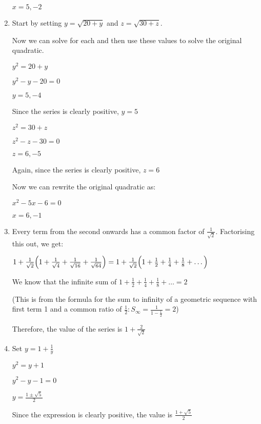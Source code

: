 \documentclass[../main.tex]{subfiles}
\begin{document}
\begin{enumerate}[itemsep=1cm]
    $x=5, -2$


    \item 
    Start by setting $y=\sqrt{20+y}$ and $z=\sqrt{30+z}$.

    Now we can solve for each and then use these values to solve the original quadratic.

    $y^2=20+y$

    $y^2-y-20=0$

    $y=5, -4$

    Since the series is clearly positive, $y=5$

    $z^2=30+z$

    $z^2-z-30=0$

    $z=6, -5$

    Again, since the series is clearly positive, $z=6$

    Now we can rewrite the original quadratic as:

    $x^2-5x-6=0$

    $x=6, -1$

    \item 
    Every term from the second onwards has a common factor of $\frac{1}{\sqrt{2}}$. Factorising this out, we get:

    $1+\frac{1}{\sqrt{2}}\Bigl(1+\frac{1}{\sqrt{4}}+\frac{1}{\sqrt{16}}+\frac{1}{\sqrt{64}}\Bigr)=1+\frac{1}{\sqrt{2}}\Bigl(1+\frac{1}{2}+\frac{1}{4}+\frac{1}{8}+\dots\Bigr)$

    We know that the infinite sum of $1+\frac{1}{2}+\frac{1}{4}+\frac{1}{8}+\dots=2$

    (This is from the formula for the sum to infinity of a geometric sequence with first term 1 and a common ratio of $\frac{1}{2} : S_\infty=\frac{1}{1-\frac{1}{2}}=2$)

    Therefore, the value of the series is $1+\frac{2}{\sqrt{2}}$

    \item 
    Set $y=1+\frac{1}{y}$

    $y^2=y+1$
    
    $y^2-y-1=0$

    $y=\frac{1\pm \sqrt{5}}{2}$

    Since the expression is clearly positive, the value is $\frac{1+\sqrt{5}}{2}$

\end{enumerate}
\end{document}

